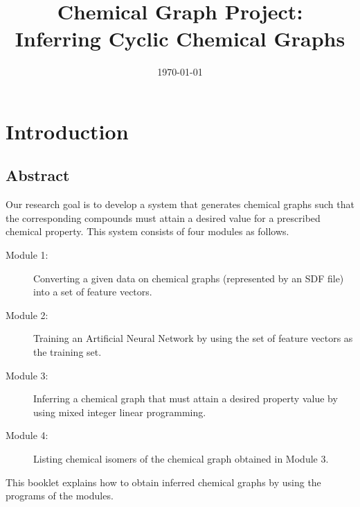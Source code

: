 \documentclass[11pt,titlepage,dvipdfmx,twoside]{book}
\title{\huge{
Chemical Graph Project: \\
Inferring Cyclic Chemical Graphs}}
\author{\project}
\begin{document}

\date{\today}

\maketitle


\hfill

\chapter*{Introduction}

\section*{Abstract}
Our research goal is to develop a system
that generates chemical graphs such that
the corresponding compounds must attain
a desired value for a prescribed chemical property.
This system consists of four modules as follows.
\begin{description}
\item[Module 1:]
Converting a given data on chemical graphs
  (represented by an SDF file) into a set of feature vectors.
  
\item[Module 2:] 
Training an Artificial Neural Network by using the set of feature vectors as the training set. 

\item[Module 3:] 
Inferring a chemical graph that must attain a desired 
property value by using mixed integer linear programming. 

\item[Module 4:] 
Listing chemical isomers of the chemical graph obtained in Module 3. 
\end{description}

This booklet explains how to obtain inferred chemical graphs
by using the programs of the modules.
\end{document}
